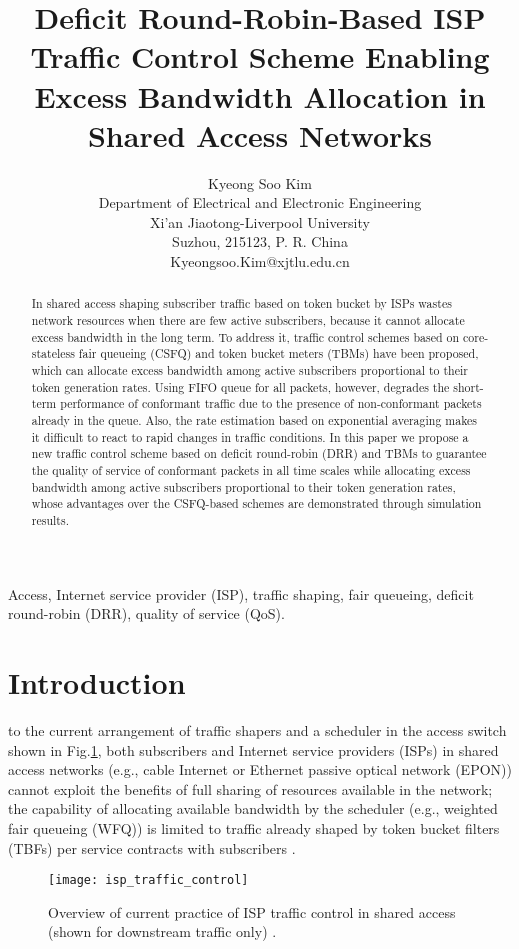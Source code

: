 \documentclass[conference,twoside,final]{IEEEtran}
\title{\LARGE Deficit Round-Robin-Based ISP Traffic Control Scheme Enabling
  Excess Bandwidth Allocation in Shared Access Networks}
\author{Kyeong Soo Kim\\Department of Electrical and Electronic
  Engineering\\Xi'an Jiaotong-Liverpool University\\Suzhou, 215123,
  P. R. China\\Kyeongsoo.Kim@xjtlu.edu.cn}
\begin{document}
\maketitle


\begin{abstract}
  In shared access shaping subscriber traffic based on token bucket by ISPs
  wastes network resources when there are few active subscribers, because it
  cannot allocate excess bandwidth in the long term. To address it, traffic
  control schemes based on core-stateless fair queueing (CSFQ) and token bucket
  meters (TBMs) have been proposed, which can allocate excess bandwidth among
  active subscribers proportional to their token generation rates. Using FIFO
  queue for all packets, however, degrades the short-term performance of
  conformant traffic due to the presence of non-conformant packets already in
  the queue. Also, the rate estimation based on exponential averaging makes it
  difficult to react to rapid changes in traffic conditions. In this paper we
  propose a new traffic control scheme based on deficit round-robin (DRR) and
  TBMs to guarantee the quality of service of conformant packets in all time
  scales while allocating excess bandwidth among active subscribers proportional
  to their token generation rates, whose advantages over the CSFQ-based schemes
  are demonstrated through simulation results.
\end{abstract}

\begin{IEEEkeywords}
  Access, Internet service provider (ISP), traffic shaping, fair queueing,
  deficit round-robin (DRR), quality of service (QoS).
\end{IEEEkeywords}


\section{Introduction}
\label{sec-1}
 to the current arrangement of traffic shapers and a
scheduler in the access switch shown in Fig.\ref{fg:isp_traffic_control},
both subscribers and Internet service providers (ISPs) in shared access networks
(e.g., cable Internet or Ethernet passive optical network (EPON)) cannot exploit
the benefits of full sharing of resources available in the network; the
capability of allocating available bandwidth by the scheduler (e.g., weighted
fair queueing (WFQ)) is limited to traffic already shaped by token bucket
filters (TBFs) per service contracts with subscribers \cite{Kim:14-5}.
\begin{figure}[!htb]
    \begin{center}
      \texttt{[image: isp\_traffic\_control]}
    \end{center}
\caption{Overview of current practice of ISP traffic control in shared access (shown for downstream traffic only) \cite{Kim:14-5}.}
  \label{fg:isp_traffic_control}
\end{figure}
\end{document}
